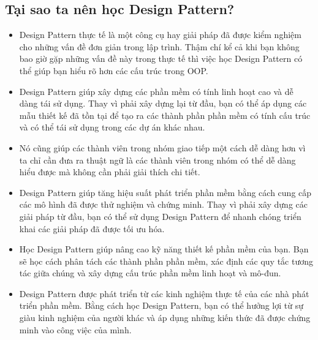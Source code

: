 \subsection{Tại sao ta nên học Design Pattern?}
\begin{itemize}
    \item Design Pattern thực tế là một công cụ hay giải pháp đã được kiểm nghiệm cho những vấn đề đơn giản trong lập trình. Thậm chí kể cả khi bạn không bao giờ gặp những vấn đề này trong thực tế thì việc học Design Pattern có thể giúp bạn hiểu rõ hơn các cấu trúc trong OOP.
    \item Design Pattern giúp xây dựng các phần mềm có tính linh hoạt cao và dễ dàng tái sử dụng. Thay vì phải xây dựng lại từ đầu, bạn có thể áp dụng các mẫu thiết kế đã tồn tại để tạo ra các thành phần phần mềm có tính cấu trúc và có thể tái sử dụng trong các dự án khác nhau.
    \item Nó cũng giúp các thành viên trong nhóm giao tiếp một cách dễ dàng hơn vì ta chỉ cần đưa ra thuật ngữ là các thành viên trong nhóm có thể dễ dàng hiểu được mà không cần phải giải thích chi tiết.
    \item Design Pattern giúp tăng hiệu suất phát triển phần mềm bằng cách cung cấp các mô hình đã được thử nghiệm và chứng minh. Thay vì phải xây dựng các giải pháp từ đầu, bạn có thể sử dụng Design Pattern để nhanh chóng triển khai các giải pháp đã được tối ưu hóa.
    \item Học Design Pattern giúp nâng cao kỹ năng thiết kế phần mềm của bạn. Bạn sẽ học cách phân tách các thành phần phần mềm, xác định các quy tắc tương tác giữa chúng và xây dựng cấu trúc phần mềm linh hoạt và mô-đun.
    \item Design Pattern được phát triển từ các kinh nghiệm thực tế của các nhà phát triển phần mềm. Bằng cách học Design Pattern, bạn có thể hưởng lợi từ sự giàu kinh nghiệm của người khác và áp dụng những kiến thức đã được chứng minh vào công việc của mình.
\end{itemize}

